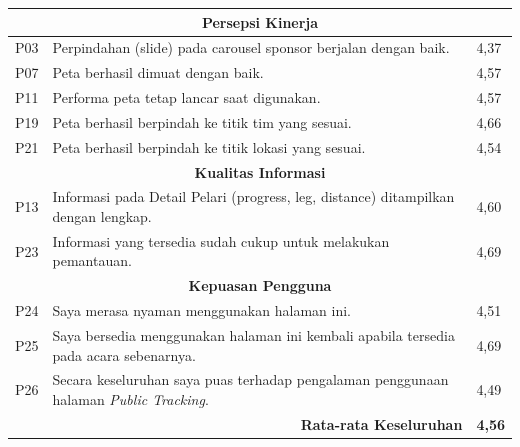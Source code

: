 \begin{longtable}{|p{1.2cm}|p{8.5cm}|p{2cm}|}
\multicolumn{3}{|c|}{\textbf{Persepsi Kinerja}} \\ \hline
P03 & Perpindahan (slide) pada carousel sponsor berjalan dengan baik. & 4,37 \\ \hline
P07 & Peta berhasil dimuat dengan baik. & 4,57 \\ \hline
P11 & Performa peta tetap lancar saat digunakan. & 4,57 \\ \hline
P19 & Peta berhasil berpindah ke titik tim yang sesuai. & 4,66 \\ \hline
P21 & Peta berhasil berpindah ke titik lokasi yang sesuai. & 4,54 \\ \hline

\multicolumn{3}{|c|}{\textbf{Kualitas Informasi}} \\ \hline
P13 & Informasi pada Detail Pelari (progress, leg, distance) ditampilkan dengan lengkap. & 4,60 \\ \hline
P23 & Informasi yang tersedia sudah cukup untuk melakukan pemantauan. & 4,69 \\ \hline

\multicolumn{3}{|c|}{\textbf{Kepuasan Pengguna}} \\ \hline
P24 & Saya merasa nyaman menggunakan halaman ini. & 4,51 \\ \hline
P25 & Saya bersedia menggunakan halaman ini kembali apabila tersedia pada acara sebenarnya. & 4,69 \\ \hline
P26 & Secara keseluruhan saya puas terhadap pengalaman penggunaan halaman \textit{Public Tracking}. & 4,49 \\ \hline

\multicolumn{2}{|r|}{\textbf{Rata-rata Keseluruhan}} & \textbf{4,56} \\ \hline

\end{longtable}
